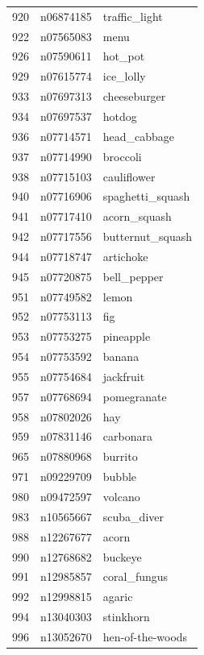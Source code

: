 \begin{table}
\begin{tabular}{cll}
920 & n06874185 & traffic_light \\
922 & n07565083 & menu \\
926 & n07590611 & hot_pot \\
929 & n07615774 & ice_lolly \\
933 & n07697313 & cheeseburger \\
934 & n07697537 & hotdog \\
936 & n07714571 & head_cabbage \\
937 & n07714990 & broccoli \\
938 & n07715103 & cauliflower \\
940 & n07716906 & spaghetti_squash \\
941 & n07717410 & acorn_squash \\
942 & n07717556 & butternut_squash \\
944 & n07718747 & artichoke \\
945 & n07720875 & bell_pepper \\
951 & n07749582 & lemon \\
952 & n07753113 & fig \\
953 & n07753275 & pineapple \\
954 & n07753592 & banana \\
955 & n07754684 & jackfruit \\
957 & n07768694 & pomegranate \\
958 & n07802026 & hay \\
959 & n07831146 & carbonara \\
965 & n07880968 & burrito \\
971 & n09229709 & bubble \\
980 & n09472597 & volcano \\
983 & n10565667 & scuba_diver \\
988 & n12267677 & acorn \\
990 & n12768682 & buckeye \\
991 & n12985857 & coral_fungus \\
992 & n12998815 & agaric \\
994 & n13040303 & stinkhorn \\
996 & n13052670 & hen-of-the-woods \\
\bottomrule
\end{tabular}
\end{table}

